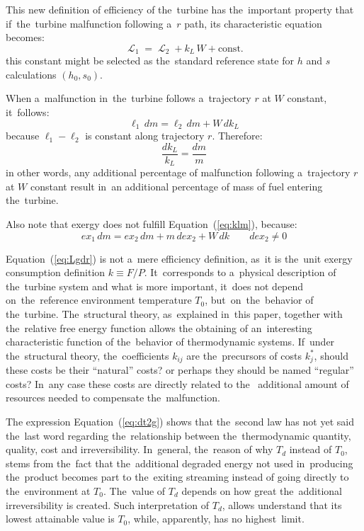 \documentclass[energies,article,accept,moreauthors,pdftex]{Definitions/mdpi}
\DeclareMathOperator{\Lgdr}{\mathcal{L}}
\begin{document}
This new definition of efficiency of the~turbine has the~important property that if~the~turbine malfunction following a~$r$ path, its characteristic equation becomes:
\begin{equation}
\Lgdr_1=\Lgdr_2 + k_L\,W + \text{const}.
\label{eq:Lgdr}
\end{equation}
this constant might be selected as the~standard reference state for $h$ and $s$ calculations $(h_0,s_0)$.

When a~malfunction in~the~turbine follows a~trajectory $r$ at $W$ constant, it~follows:
\begin{equation}
    \ell_1\, dm = \ell_2\, dm + W\,dk_L
\end{equation}
because $\ell_1-\ell_2$ is constant along trajectory $r$. Therefore:
\begin{equation}
    \frac{dk_L}{k_L}=\frac{dm}{m}
    \label{eq:klm}
\end{equation}
in other words, any additional percentage of malfunction following a~trajectory $r$ at $W$ constant result in~an additional percentage of mass of fuel entering the~turbine.

Also note that exergy does not fulfill Equation~(\ref{eq:klm}), because:
\[
	ex_1\,dm = ex_2\,dm + m\,dex_2 + W\,dk\qquad dex_2\neq0
\]

Equation~(\ref{eq:Lgdr}) is not a~mere efficiency definition, as~it is the~unit exergy consumption definition $k\equiv F/P$. It~corresponds to a~physical description of the~turbine system and what is more important, it~does not depend on~the~reference environment temperature $T_0$, but~on~the~behavior of the~turbine. The~structural theory, as~explained in~this paper, together with the~relative free energy function allows the obtaining of an~interesting characteristic function of the~behavior of thermodynamic systems. If~under the~structural theory, the~coefficients $k_{ij}$ are the~precursors of costs $k_j^*$, should these costs be their “natural” costs? or perhaps they should be named “regular” costs? In~any case these costs are directly related to the~ additional amount of resources needed to compensate the~malfunction.

The expression Equation~(\ref{eq:dt2g}) shows that the~second law has not yet said the~last word regarding the~relationship between the~thermodynamic quantity, quality, cost and irreversibility. In~general, the~reason of why $T_d$ instead of $T_0$, stems from the~fact that the~additional degraded energy not used in~producing the~product becomes part to the~exiting streaming instead of going directly to the~environment at $T_0$.  The~value of $T_d$ depends on how great the~additional irreversibility is created. Such interpretation of $T_d$, allows understand that its lowest attainable value is $T_0$, while, apparently, has no highest~limit.
\end{document}
